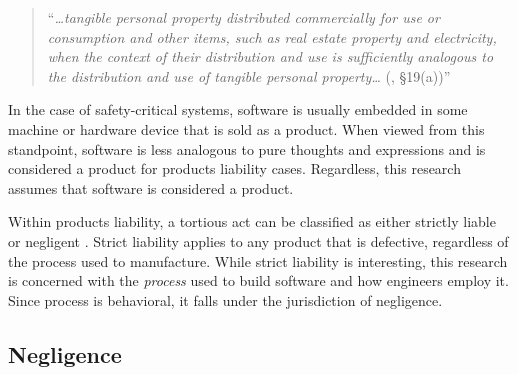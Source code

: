 \documentclass[12pt]{report}
\begin{document}
\begin{quote} 
``\textit{\ldots tangible personal property distributed commercially for use or consumption and other items, such as real estate property and electricity, when the context of their distribution and use is sufficiently analogous to the distribution and use of tangible personal property\ldots} (\cite{Rest3d}, \S19(a))''  
\end{quote} 

In the case of safety-critical systems, software is usually embedded in some machine or hardware device \cite{Leveson95} that is sold as a product. When viewed from this standpoint, software is less analogous to pure thoughts and expressions and is considered a product for products liability cases. Regardless, this research assumes that software is considered a product. 

Within products liability, a tortious act can be classified as either strictly liable or negligent \cite{Turner99}. Strict liability applies to any product that is defective, regardless of the process used to manufacture. While strict liability is interesting, this research is concerned with the \textit{process} used to build software and how engineers employ it. Since process is behavioral, it falls under the jurisdiction of negligence. 

\subsection{Negligence} 
\end{document}
